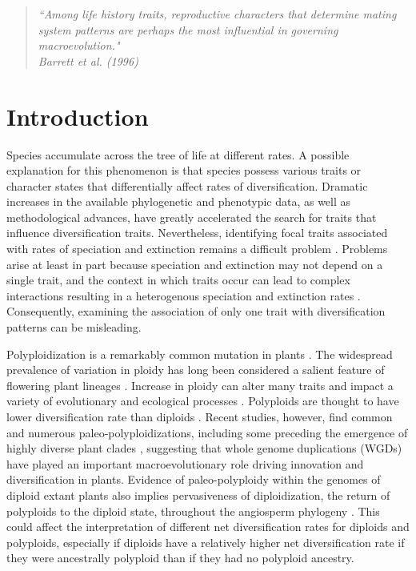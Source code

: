 \begin{quote}
\em{``Among life history traits, reproductive characters that determine mating system patterns are perhaps the most influential in governing macroevolution." 
}
\\
\hspace*{\fill}\rm{ Barrett et al. (1996)}
\end{quote}

\section{Introduction}

Species accumulate across the tree of life at different rates. 
A possible explanation for this phenomenon is that species possess various traits or character states that differentially affect rates of diversification. 
Dramatic increases in the available phylogenetic and phenotypic data, as well as methodological advances, have greatly accelerated the search for traits that influence diversification traits.
Nevertheless, identifying focal traits associated with rates of speciation and extinction remains a difficult problem \citep[\eg][]{maddison_2015, rabosky_2015, moore_2016, fitzjohn_2009, goldberg_2012, beaulieu_2016, rabosky_2017}. 
Problems arise at least in part because speciation and extinction may not depend on a single trait, and the context in which traits occur can lead to complex interactions resulting in a heterogenous speciation and extinction rates \citep{beaulieu_2016, caetano_2018, herrera_2018}.
Consequently, examining the association of only one trait with diversification patterns can be misleading. 

Polyploidization is a remarkably common mutation in plants \citep{husband_2013, zenilferguson_2017}.
The widespread prevalence of variation in ploidy has long been considered a salient feature of flowering plant lineages \citep{stebbins1938}. 
Increase in ploidy can alter many traits and impact a variety of evolutionary \citep{ramsey_2002} and ecological processes \citep{sessa_2019}.
%
Polyploids are thought to have lower diversification rate than diploids \citep{mayrose_2011, mayrose_2015}. 
Recent studies, however, find common and numerous paleo-polyploidizations, including some preceding the emergence of highly diverse plant clades \citep{soltis_2014, landis_2018}, suggesting that whole genome duplications (WGDs) have played an important macroevolutionary role driving innovation and diversification in plants. 
Evidence of paleo-polyploidy within the genomes of diploid extant plants also implies pervasiveness of diploidization, the return of polyploids to the diploid state, throughout the angiosperm phylogeny \citep{soltis_2015, dodsworth_2015}.
This could affect the interpretation of different net diversification rates for diploids and polyploids, especially if diploids have a relatively higher net diversification rate if they were ancestrally polyploid than if they had no polyploid ancestry.

